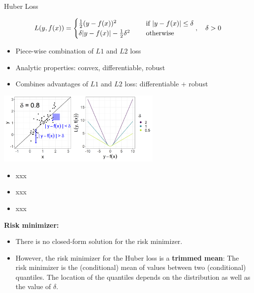 \begin{vbframe}{Huber Loss}

\vspace*{-0.3cm}

$$
L(y, f(x)) = \begin{cases}
  \frac{1}{2}(y - f(x))^2  & \text{ if } |y - f(x)| \le \delta \\
  \delta |y - f(x)|-\frac{1}{2}\delta^2 \quad & \text{ otherwise }
  \end{cases}, \quad \delta > 0
$$

\begin{itemize}
\item Piece-wise combination of $L1$ and $L2$ loss
\item Analytic properties: convex, differentiable, robust
\item Combines advantages of $L1$ and $L2$ loss: differentiable + robust
\end{itemize}



\begin{center}
\includegraphics[width = 0.6\textwidth]{figure/loss_huber_plot.png}
\end{center}

\begin{itemize}
\item xxx
\item xxx
\item xxx
\end{itemize}

\framebreak 

\textbf{Risk minimizer:}
\begin{itemize}
\item There is no closed-form solution for the risk minimizer. 
\item However, the risk minimizer for the Huber loss is a \textbf{trimmed mean}: The risk minimizer is the (conditional) mean of values between two (conditional) quantiles. The location of the quantiles depends on the distribution as well as 
the value of $\delta$. 
\end{itemize}


\end{vbframe}
